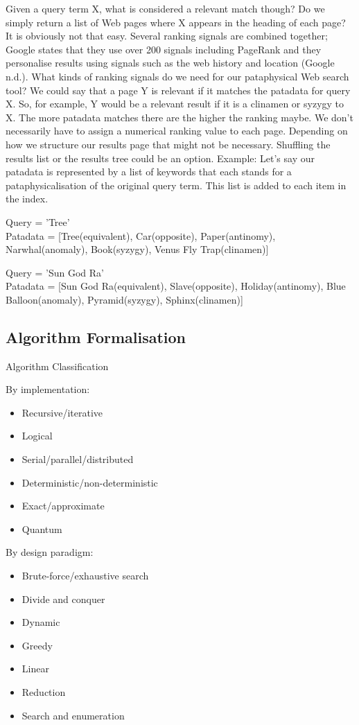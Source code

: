 Given a query term X, what is considered a relevant match though? Do we simply return a list of Web pages where X appears in the heading of each page? It is obviously not that easy. Several ranking signals are combined together; Google states that they use over 200 signals including PageRank and they personalise results using signals such as the web history and location (Google n.d.).
What kinds of ranking signals do we need for our pataphysical Web search tool? We could say that a page Y is relevant if it matches the patadata for query X. So, for example, Y would be a relevant result if it is a clinamen or syzygy to X. The more patadata matches there are the higher the ranking maybe. We don't necessarily have to assign a numerical ranking value to each page. Depending on how we structure our results page that might not be necessary. Shuffling the results list or the results tree could be an option.
Example: Let's say our patadata is represented by a list of keywords that each stands for a pataphysicalisation of the original query term. This list is added to each item in the index.

Query      = 'Tree'\\
Patadata = [Tree(equivalent),  Car(opposite), Paper(antinomy), Narwhal(anomaly), Book(syzygy), Venus Fly Trap(clinamen)]

Query      = 'Sun God Ra'\\
Patadata = [Sun God Ra(equivalent),  Slave(opposite), Holiday(antinomy), Blue Balloon(anomaly), Pyramid(syzygy), Sphinx(clinamen)]

\subsection{Algorithm Formalisation}

Algorithm Classification

By implementation:
\begin{itemize}
  \item Recursive/iterative
  \item Logical
  \item Serial/parallel/distributed
  \item Deterministic/non-deterministic
  \item Exact/approximate
  \item Quantum
\end{itemize}

By design paradigm:
\begin{itemize}
  \item Brute-force/exhaustive search
  \item Divide and conquer
  \item Dynamic
  \item Greedy
  \item Linear
  \item Reduction
  \item Search and enumeration
\end{itemize}


